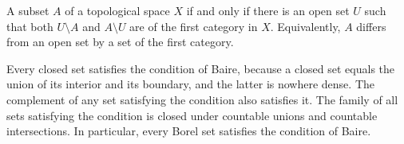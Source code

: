 A subset $A$ of a topological space $X$  if and only if there is an open set $U$ such that both $U \setminus A$ and $A \setminus U$ are of the first category in $X$. Equivalently, $A$ differs from an open set by a set of the first category.

Every closed set satisfies the condition of Baire, because a closed set equals the union of its interior and its boundary, and the latter is nowhere dense. The complement of any set satisfying the condition also satisfies it. The family of all sets satisfying the condition is closed under countable unions and countable intersections. In particular, every Borel set satisfies the condition of Baire.
